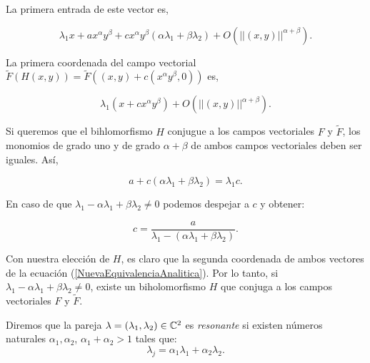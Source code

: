 \noindent La primera entrada de este vector es,

\begin{equation*}
\lambda_{1}x +ax^{\alpha}y^{\beta}+cx^{\alpha}y^{\beta}(\alpha\lambda_{1} +\beta\lambda_{2}) +O(||(x,y)||^{\alpha+\beta}).
\end{equation*} 

\noindent La primera coordenada del campo vectorial $\tilde{F}(H(x,y))=\tilde{F}((x,y)+c(x^{\alpha}y^{\beta},0))$ es,

\begin{equation*}
\lambda_{1}(x+cx^{\alpha}y^{\beta}) + O(||(x,y)||^{\alpha+\beta}).
\end{equation*}

\noindent Si queremos que el bihlomorfismo $H$ conjugue a los campos vectoriales $F$ y $\tilde{F}$, los monomios de grado uno y de grado $\alpha + \beta$ de ambos campos vectoriales deben ser iguales. Así,

\begin{equation}
a+c(\alpha\lambda_{1}+\beta\lambda_{2})=\lambda_{1}c.
\end{equation}

En caso de que $\lambda_{1}-\alpha\lambda_{1}+\beta\lambda_{2}\neq 0$ podemos despejar a $c$ y obtener:


\begin{equation}
c = \frac{a}{\lambda_{1} -(\alpha\lambda_{1} + \beta\lambda_{2})}.
\end{equation}

Con nuestra elección de $H$, es claro que la segunda coordenada de ambos vectores de la ecuación (\ref{NuevaEquivalenciaAnalitica}). Por lo tanto, si $\lambda_{1}-\alpha\lambda_{1}+\beta\lambda_{2}\neq 0$, existe un biholomorfismo $H$ que conjuga a los campos vectoriales $F$ y $\tilde{F}$.
\begin{defn}
\label{Def:Resonancias}
Diremos que la pareja $\lambda=(\lambda_{1},\lambda_{2})\in\mathbb{C}^{2}$ es \emph{resonante} si existen números naturales $\alpha_{1},\alpha_{2}$, $\alpha_{1}+\alpha_{2}>1$ tales que:
\begin{equation}
\label{Denominadores}
\lambda_{j}=\alpha_{1}\lambda_{1}+\alpha_{2}\lambda_{2}.
\end{equation}
\end{defn}

